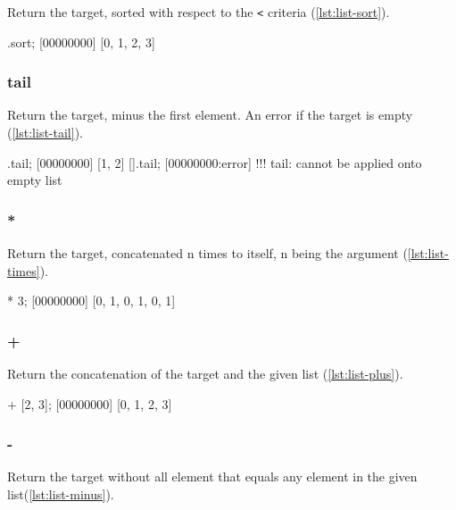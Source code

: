 Return the target, sorted with respect to the \lstinline|<| criteria
(\autoref{lst:list-sort}).

\begin{urbiscript}[caption=List.sort, label=lst:list-sort, float=\floatposh]
[1, 0, 3, 2].sort;
[00000000] [0, 1, 2, 3]
\end{urbiscript}

\subsubsection{tail}

Return the target, minus the first element. An error if the target is
empty (\autoref{lst:list-tail}).

\begin{urbiscript}[caption=List.tail, label=lst:list-tail, float=\floatposh]
[0, 1, 2].tail;
[00000000] [1, 2]
[].tail;
[00000000:error] !!! tail: cannot be applied onto empty list
\end{urbiscript}

\subsubsection{*}

Return the target, concatenated n times to itself, n being the
argument (\autoref{lst:list-times}).

\begin{urbiscript}[caption=List.'*', label=lst:list-times,
  float=\floatposh]
[0, 1] * 3;
[00000000] [0, 1, 0, 1, 0, 1]
\end{urbiscript}

\subsubsection{+}

Return the concatenation of the target and the given list
(\autoref{lst:list-plus}).

\begin{urbiscript}[caption=List.'+', label=lst:list-plus,
  float=\floatpos]
[0, 1] + [2, 3];
[00000000] [0, 1, 2, 3]
\end{urbiscript}

\subsubsection{-}

Return the target without all element that equals any element in the
given list(\autoref{lst:list-minus}).

